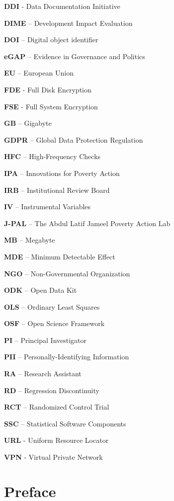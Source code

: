 \documentclass[
]{book}
\begin{document}
\textbf{DDI} - Data Documentation Initiative

\textbf{DIME} -- Development Impact Evaluation

\textbf{DOI} -- Digital object identifier

\textbf{eGAP} -- Evidence in Governance and Politics

\textbf{EU} -- European Union

\textbf{FDE} - Full Disk Encryption

\textbf{FSE} - Full System Encryption

\textbf{GB} -- Gigabyte

\textbf{GDPR} -- Global Data Protection Regulation

\textbf{HFC} -- High-Frequency Checks

\textbf{IPA} -- Innovations for Poverty Action

\textbf{IRB} -- Institutional Review Board

\textbf{IV} -- Instrumental Variables

\textbf{J-PAL} -- The Abdul Latif Jameel Poverty Action Lab

\textbf{MB} -- Megabyte

\textbf{MDE} -- Minimum Detectable Effect

\textbf{NGO} -- Non-Governmental Organization

\textbf{ODK} -- Open Data Kit

\textbf{OLS} -- Ordinary Least Squares

\textbf{OSF} -- Open Science Framework

\textbf{PI} -- Principal Investigator

\textbf{PII} -- Personally-Identifying Information

\textbf{RA} -- Research Assistant

\textbf{RD} -- Regression Discontinuity

\textbf{RCT} -- Randomized Control Trial

\textbf{SSC} -- Statistical Software Components

\textbf{URL} - Uniform Resource Locator

\textbf{VPN} - Virtual Private Network

\hypertarget{preface}{%
\chapter{Preface}\label{preface}}
\end{document}
